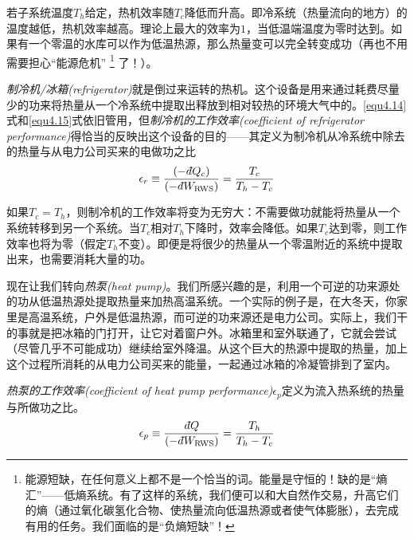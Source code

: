 若子系统温度$T_h$给定，热机效率随$T_c$降低而升高。即冷系统（热量流向的地方）的温度越低，热机效率越高。理论上最大的效率为$1$，当低温端温度为零时达到。如果有一个零温的水库可以作为低温热源，那么热量变可以完全转变成功（再也不用需要担心“能源危机”%
\footnote{能源短缺，在任何意义上都不是一个恰当的词。能量是守恒的！缺的是“熵汇”——低熵系统。有了这样的系统，我们便可以和大自然作交易，升高它们的熵（通过氧化碳氢化合物、使热量流向低温热源或者使气体膨胀），去完成有用的任务。我们面临的是“负熵短缺”！}%
%
了！）。

{\it 制冷机/冰箱(refrigerator)}就是倒过来运转的热机。这个设备是用来通过耗费尽量少的功来将热量从一个冷系统中提取出释放到相对较热的环境大气中的。\eqref{equ4.14}式和\eqref{equ4.15}式依旧管用，但{\it 制冷机的工作效率(coefficient of refrigerator performance)}得恰当的反映出这个设备的目的——其定义为制冷机从冷系统中除去的热量与从电力公司买来的电做功之比
\begin{equation}
\epsilon_r \equiv \frac{(-d\hspace*{-0.08em}\bar{}\hspace*{0.1em} Q_c)}{(-d\hspace*{-0.08em}\bar{}\hspace*{0.1em} W_\text{RWS})} = \frac{T_c}{T_h-T_c}
\end{equation}

如果$T_c=T_h$，则制冷机的工作效率将变为无穷大：不需要做功就能将热量从一个系统转移到另一个系统。当$T_c$相对$T_h$下降时，效率会降低。如果$T_c$达到零，则工作效率也将为零（假定$T_h$不变）。即便是将很少的热量从一个零温附近的系统中提取出来，也需要消耗大量的功。

现在让我们转向{\it 热泵(heat pump)}。我们所感兴趣的是，利用一个可逆的功来源处的功从低温热源处提取热量来加热高温系统。一个实际的例子是，在大冬天，你家里是高温系统，户外是低温热源，而可逆的功来源还是电力公司。实际上，我们干的事就是把冰箱的门打开，让它对着窗户外。冰箱里和室外联通了，它就会尝试（尽管几乎不可能成功）继续给室外降温。从这个巨大的热源中提取的热量，加上这个过程所消耗的从电力公司买来的能量，一起通过冰箱的冷凝管排到了室内。

{\it 热泵的工作效率(coefficient of heat pump performance)}$\epsilon_p$定义为流入热系统的热量与所做功之比。
\begin{equation}
\epsilon_p \equiv \frac{d\hspace*{-0.08em}\bar{}\hspace*{0.1em} Q}{(-d\hspace*{-0.08em}\bar{}\hspace*{0.1em} W_\text{RWS})} = \frac{T_h}{T_h-T_c}
\end{equation}

